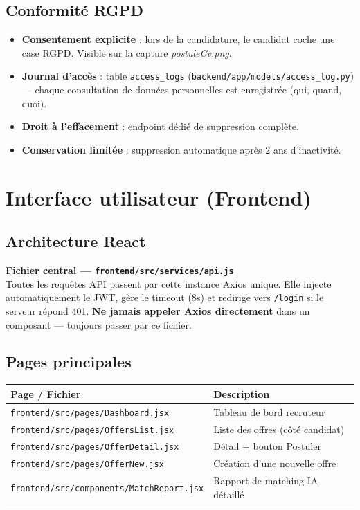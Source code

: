 \documentclass[12pt,a4paper]{report}
\newenvironment{infobox}[1][]{%
  \begin{framed}\noindent\textbf{\textcolor{navyblue}{#1}}\\[2pt]%
}{\end{framed}}
\newcommand{\filepath}[1]{\texttt{\small\textcolor{codeblue}{#1}}}
\begin{document}
\section{Conformité RGPD}

\begin{itemize}
  \item \textbf{Consentement explicite} : lors de la candidature, le candidat coche
        une case RGPD. Visible sur la capture \textit{postuleCv.png}.
  \item \textbf{Journal d'accès} : table \texttt{access\_logs}
        (\filepath{backend/app/models/access\_log.py}) — chaque consultation de
        données personnelles est enregistrée (qui, quand, quoi).
  \item \textbf{Droit à l'effacement} : endpoint dédié de suppression complète.
  \item \textbf{Conservation limitée} : suppression automatique après 2 ans d'inactivité.
\end{itemize}

\chapter{Interface utilisateur (Frontend)}

\section{Architecture React}

\begin{infobox}[Fichier central — \filepath{frontend/src/services/api.js}]
Toutes les requêtes API passent par cette instance Axios unique.
Elle injecte automatiquement le JWT, gère le timeout (8s) et redirige
vers \texttt{/login} si le serveur répond 401.
\textbf{Ne jamais appeler Axios directement} dans un composant — toujours
passer par ce fichier.
\end{infobox}

\section{Pages principales}

\begin{center}
\begin{tabularx}{\textwidth}{lX}
\toprule
\textbf{Page / Fichier} & \textbf{Description} \\
\midrule
\filepath{frontend/src/pages/Dashboard.jsx} & Tableau de bord recruteur \\
\filepath{frontend/src/pages/OffersList.jsx} & Liste des offres (côté candidat) \\
\filepath{frontend/src/pages/OfferDetail.jsx} & Détail + bouton Postuler \\
\filepath{frontend/src/pages/OfferNew.jsx} & Création d'une nouvelle offre \\
\filepath{frontend/src/components/MatchReport.jsx} & Rapport de matching IA détaillé \\
\bottomrule
\end{tabularx}
\end{center}
\end{document}
